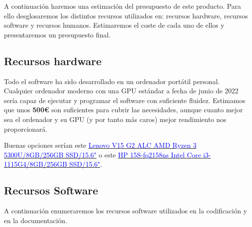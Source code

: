 A continuación haremos una estimación del presupuesto de este producto. Para ello desglosaremos los distintos recursos utilizados en: recursos hardware, recursos software y recursos humanos. Estimaremos el coste de cada uno de ellos y presentaremos un presupuesto final.

\subsection{Recursos hardware}

Todo el software ha sido desarrollado en un ordenador portátil personal. Cualquier ordenador moderno con una GPU estándar a fecha de junio de 2022 sería capaz de ejecutar y programar el software con suficiente fluidez. Estimamos que unos \textbf{500\euro} son suficientes para cubrir las necesidades, aunque cuanto mejor sea el ordenador y su GPU (y por tanto más caros) mejor rendimiento nos proporcionará.

Buenas opciones serían este \href{https://www.pccomponentes.com/lenovo-v15-g2-alc-amd-ryzen-3-5300u-8gb-256gb-ssd-156}{\textcolor{blue}{Lenovo V15 G2 ALC AMD Ryzen 3 5300U/8GB/256GB SSD/15.6"}} o este \href{https://www.pccomponentes.com/hp-15s-fq2158ns-intel-core-i3-1115g4-8gb-256gb-ssd-156}{\textcolor{blue}{HP 15S-fq2158ns Intel Core i3-1115G4/8GB/256GB SSD/15.6"}}.

\subsection{Recursos Software}

A continuación enumeraremos los recursos software utilizados en la codificación y en la documentación.

